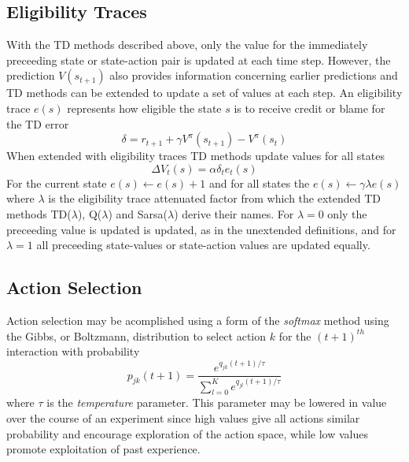 \subsection{Eligibility Traces}
With the TD methods described above, only the value for the immediately
preceeding state or state-action pair is updated at each time step.  However,
the prediction $V(s_{t+1})$ also provides information concerning earlier
predictions and TD methods can be extended to update a set of values at each step.  An eligibility trace $e(s)$ represents how eligible the state $s$ is to receive
credit or blame for the TD error
\begin{equation}
\delta = r_{t+1} + \gamma V^\pi(s_{t+1}) - V^\pi(s_t)
\end{equation}
When extended with eligibility traces TD methods update values for all states
\begin{equation}
\Delta V_t(s) = \alpha \delta_t e_t(s)
\end{equation}
For the current state $e(s) \leftarrow e(s) + 1$ and for all states the
$e(s) \leftarrow \gamma \lambda e(s)$ where $\lambda$ is the eligibility trace
attenuated factor from which the extended TD methods TD($\lambda$),
Q($\lambda$) and Sarsa($\lambda$) derive their names. For $\lambda = 0$ only
the preceeding value is updated is updated, as in the unextended definitions,
and for $\lambda = 1$ all preceeding state-values or state-action values are
updated equally.

\subsection{Action Selection}
Action selection may be acomplished using a form of the \textit{softmax} method
\cite{suttonbarto:1998} using the Gibbs, or Boltzmann, distribution to select
action $k$ for the $(t+1)^{th}$ interaction with probability
\begin{equation}
p_{jk}(t+1) = \frac{e^{q_{jk}(t+1)/\tau}}{\sum_{l=0}^K e^{q_{jl}(t+1)/\tau}}
\end{equation}
where $\tau$ is the \textit{temperature} parameter.  This parameter may be
lowered in value over the course of an experiment since high values give all
actions similar probability and encourage exploration of the action space,
while low values promote exploitation of past experience.

